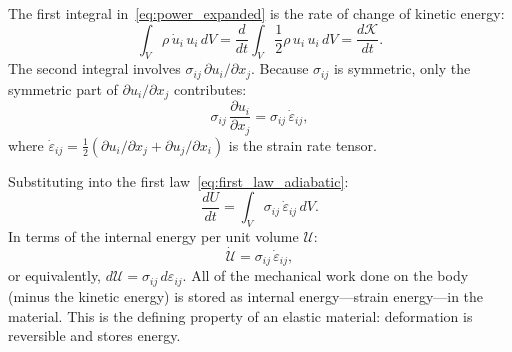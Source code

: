\documentclass[11pt]{article}
\begin{document}
\medskip
\noindent The first integral in~\eqref{eq:power_expanded} is the rate of change of kinetic energy:
\begin{equation}
  \int_V \rho\,\dot{u}_i\,u_i\,dV = \frac{d}{dt}\int_V \frac{1}{2}\rho\,u_i\,u_i\,dV = \frac{d\mathcal{K}}{dt}.
\end{equation}
The second integral involves $\sigma_{ij}\,\partial u_i / \partial x_j$.  Because $\sigma_{ij}$ is symmetric, only the symmetric part of $\partial u_i / \partial x_j$ contributes:
\begin{equation}
  \sigma_{ij}\,\frac{\partial u_i}{\partial x_j} = \sigma_{ij}\,\dot{\varepsilon}_{ij},
\end{equation}
where $\dot{\varepsilon}_{ij} = \frac{1}{2}(\partial u_i / \partial x_j + \partial u_j / \partial x_i)$ is the strain rate tensor.

\medskip
\noindent Substituting into the first law~\eqref{eq:first_law_adiabatic}:
\begin{equation}
  \frac{dU}{dt} = \int_V \sigma_{ij}\,\dot{\varepsilon}_{ij}\,dV.
  \label{eq:internal_energy_rate}
\end{equation}
In terms of the internal energy per unit volume $\mathcal{U}$:
\begin{equation}
  \boxed{\dot{\mathcal{U}} = \sigma_{ij}\,\dot{\varepsilon}_{ij},}
  \label{eq:strain_energy_rate}
\end{equation}
or equivalently, $d\mathcal{U} = \sigma_{ij}\,d\varepsilon_{ij}$.  All of the mechanical work done on the body (minus the kinetic energy) is stored as internal energy---strain energy---in the material.  This is the defining property of an elastic material: deformation is reversible and stores energy.
\end{document}
